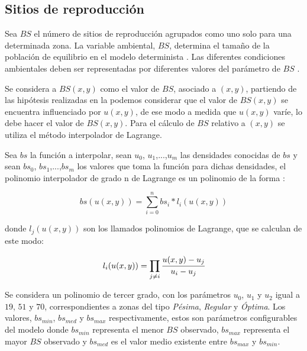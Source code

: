 \subsection{Sitios de reproducción}
\label{subsec:cap4-sitios de reproduccion}
Sea $BS$ el número de sitios de reproducción agrupados como uno solo para una determinada zona. La
variable ambiental, $BS$, determina el tamaño de la población de equilibrio en el modelo
determinista \cite{otero2006stochastic, otero2008stochastic}. Las diferentes condiciones
ambientales deben ser representadas por diferentes valores del parámetro de $BS$
\cite{otero2008stochastic}.

Se considera a $BS(x,y)$ como el valor de $BS$, asociado a $(x,y)$, partiendo de las hipótesis
realizadas en la  podemos considerar que el valor de $BS(x,y)$ se
encuentra influenciado por $u(x,y)$, de ese modo a medida que $u(x,y)$ varíe, lo debe hacer el
valor de $BS(x,y)$. Para el cálculo de $BS$ relativo a $(x,y)$ se utiliza el método interpolador
de Lagrange.

Sea $bs$ la función a interpolar, sean $u_0$, $u_1$,...,$u_m$ las densidades conocidas de $bs$ y
sean $bs_0$, $bs_1$,...,$bs_m$ los valores que toma la función para dichas densidades, el polinomio interpolador de grado n de Lagrange es un polinomio de la forma :

\begin{equation}
\label{eq:sitios-reproduccion-x-y}
    bs(u(x,y)) = \sum_{i=0}^{n} bs_{i} * l_{i}(u(x,y))
\end{equation}

donde $l_j(u(x,y))$ son los llamados polinomios de Lagrange, que se calculan de este modo:

\begin{equation}
\label{eq:sitios-reproduccion-x-y}
    l_{i}(u(x,y)) = \prod_{j \neq i} \cfrac{u(x,y) - u_{j}}{u_{i} - u_{j}}
\end{equation}

Se considera un polinomio de tercer grado, con los parámetros $u_0$, $u_1$ y $u_2$ igual a $19$,
$51$ y $70$, correspondientes a zonas del tipo \textit{Pésima}, \textit{Regular} y \textit{Óptima}.
Los valores, $bs_{min}$, $bs_{med}$ y $bs_{max}$ respectivamente, estos son parámetros
configurables del modelo donde $bs_{min}$ representa el menor $BS$ observado, $bs_{max}$
representa el mayor $BS$ observado y  $bs_{med}$ es el valor medio existente entre $bs_{max}$ y
$bs_{min}$.
